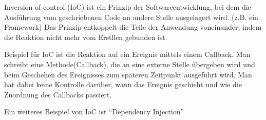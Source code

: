 Inversion of control (IoC) ist ein Prinzip der Softwareentwicklung, 
bei dem die Ausführung vom geschriebenen Code an andere Stelle ausgelagert wird.
(z.B. ein Framework)
Das Prinzip entkoppelt die Teile der Anwendung voneinander, indem die Reaktion nicht mehr vom 
Erstllen gebunden ist.

Beispiel für IoC ist die Reaktion auf ein Ereignis mittels einem Callback. 
Man schreibt eine Methode(Callback), die an eine externe Stelle übergeben wird und 
beim Geschehen des Ereignisses zum späteren Zeitpunkt ausgeführt wird. 
Man hat dabei keine Kontrolle darüber, wann das Ereignis geschieht und wie die Zuordnung des Callbacks passiert.

Ein weiteres Beispiel von IoC ist ``Dependency Injection''